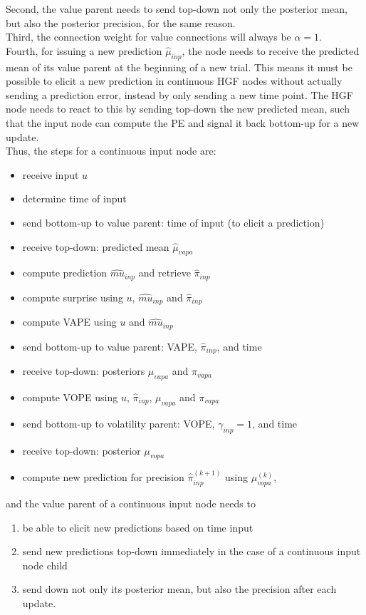 Second, the value parent needs to send top-down not only the posterior mean, but also the posterior precision, for the same reason.\\

Third, the connection weight for value connections will always be $\alpha = 1$.\\

Fourth, for issuing a new prediction $\hat{\mu}_{inp}$, the node needs to receive the predicted mean of its value parent at the beginning of a new trial. This means it must be possible to elicit a new prediction in continuous HGF nodes without actually sending a prediction error, instead by only sending a new time point. The HGF node needs to react to this by sending top-down the new predicted mean, such that the input node can compute the \textsf{PE} and signal it back bottom-up for a new update.\\

Thus, the steps for a continuous input node are:
\begin{itemize}
    \item receive input $u$
    \item determine time of input
    \item send bottom-up to value parent: time of input (to elicit a prediction)
    \item receive top-down: predicted mean $\hat{\mu}_{vapa}$
    \item compute prediction $\hat{mu}_{inp}$ and retrieve $\hat{\pi}_{inp}$
    \item compute surprise using $u$, $\hat{mu}_{inp}$ and $\hat{\pi}_{inp}$
    \item compute \textsf{VAPE} using $u$ and $\hat{mu}_{inp}$
    \item send bottom-up to value parent: \textsf{VAPE}, $\hat{\pi}_{inp}$, and time
    \item receive top-down: posteriors $\mu_{vapa}$ and $\pi_{vapa}$
    \item compute \textsf{VOPE} using $u$, $\hat{\pi}_{inp}$, $\mu_{vapa}$ and $\pi_{vapa}$
    \item send bottom-up to volatility parent: \textsf{VOPE}, $\gamma_{inp} = 1$, and time
    \item receive top-down: posterior $\mu_{vopa}$
    \item compute new prediction for precision $\hat{\pi}_{inp}^{(k+1)}$ using $\mu_{vopa}^{(k)}$,
\end{itemize}

and the value parent of a continuous input node needs to 
\begin{enumerate}
    \item be able to elicit new predictions based on time input
    \item send new predictions top-down immediately in the case of a continuous input node child
    \item send down not only its posterior mean, but also the precision after each update.
\end{enumerate}

